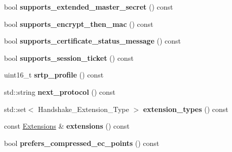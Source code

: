 \begin{DoxyCompactItemize}
\mbox{\label{class_botan_1_1_t_l_s_1_1_server___hello_aead7398f1d6b04667f2b07cc3c037e69}} 
bool {\bfseries supports\+\_\+extended\+\_\+master\+\_\+secret} () const
\item 
\mbox{\label{class_botan_1_1_t_l_s_1_1_server___hello_a6ce3a08dd5830fb045abe73e16a287c9}} 
bool {\bfseries supports\+\_\+encrypt\+\_\+then\+\_\+mac} () const
\item 
\mbox{\label{class_botan_1_1_t_l_s_1_1_server___hello_a839bae8a47c772d74d82c237bb5ae364}} 
bool {\bfseries supports\+\_\+certificate\+\_\+status\+\_\+message} () const
\item 
\mbox{\label{class_botan_1_1_t_l_s_1_1_server___hello_a8225b017d30ee0ba77d633d1c11a0ea4}} 
bool {\bfseries supports\+\_\+session\+\_\+ticket} () const
\item 
\mbox{\label{class_botan_1_1_t_l_s_1_1_server___hello_a46f04ecb1aad28bfe45d0ba2b177ad0d}} 
uint16\+\_\+t {\bfseries srtp\+\_\+profile} () const
\item 
\mbox{\label{class_botan_1_1_t_l_s_1_1_server___hello_a0d4f16bda622b1d96f8d5c601df681fd}} 
std\+::string {\bfseries next\+\_\+protocol} () const
\item 
\mbox{\label{class_botan_1_1_t_l_s_1_1_server___hello_a2807fa56d95fe67bd7934f8f22fa57aa}} 
std\+::set$<$ Handshake\+\_\+\+Extension\+\_\+\+Type $>$ {\bfseries extension\+\_\+types} () const
\item 
\mbox{\label{class_botan_1_1_t_l_s_1_1_server___hello_a2c86f968d47b2d3d646d0f9194b7417f}} 
const \mbox{\hyperlink{class_botan_1_1_t_l_s_1_1_extensions}{Extensions}} \& {\bfseries extensions} () const
\item 
\mbox{\label{class_botan_1_1_t_l_s_1_1_server___hello_a4d8cad563a24d80b8535f243f338a706}} 
bool {\bfseries prefers\+\_\+compressed\+\_\+ec\+\_\+points} () const

\end{DoxyCompactItemize}
